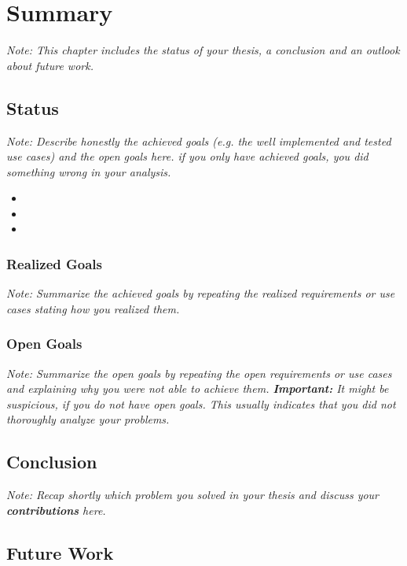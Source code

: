 \documentclass[a4paper,12pt,twoside]{report}
\begin{document}

\chapter{Summary}

\textit{Note: This chapter includes the status of your thesis, a conclusion and an outlook about future work.}

\section{Status}

\textit{Note: Describe honestly the achieved goals (e.g. the well implemented and tested use cases) and the open goals here. if you only have achieved goals, you did something wrong in your analysis.}

\begin{itemize}
	\item [\Circle]
	\item [\LEFTcircle]
	\item [\CIRCLE]
\end{itemize}

\subsection{Realized Goals}

\textit{Note: Summarize the achieved goals by repeating the realized requirements or use cases stating how you realized them.}

\subsection{Open Goals}

\textit{Note: Summarize the open goals by repeating the open requirements or use cases and explaining why you were not able to achieve them. \textbf{Important:} It might be suspicious, if you do not have open goals. This usually indicates that you did not thoroughly analyze your problems.}

\section{Conclusion}

\textit{Note: Recap shortly which problem you solved in your thesis and discuss your \textbf{contributions} here.}

\section{Future Work}
\end{document}

